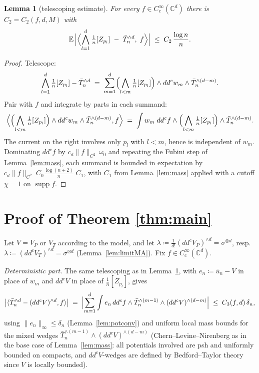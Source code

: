 \documentclass[12pt]{article}
\def\C{\mathbb{C}}
\def\E{\mathbb{E}}
\def\ddc{dd^c}
\DeclareMathOperator{\supp}{supp}
\newtheorem{lemma}{Lemma}[section]
\begin{document}
\begin{lemma}[telescoping estimate]\label{lem:telescope}
For every $f \in C^\infty_c(\C^d)$ there is $C_2 = C_2(f,d,M)$ with
\[
  \E\, \Bigl| \Bigl\langle \bigwedge_{l=1}^d \tfrac1n [Z_{p_l}]
  \;-\; \bar T_n^{\wedge d}, \; f \Bigr\rangle \Bigr|
  \;\le\; C_2\, \frac{\log n}{n} .
\]
\end{lemma}

\begin{proof}
Telescope:
\[
  \bigwedge_{l=1}^d \tfrac1n [Z_{p_l}] - \bar T_n^{\wedge d}
  \;=\; \sum_{m=1}^{d} \Bigl( \bigwedge_{l<m} \tfrac1n [Z_{p_l}] \Bigr)
        \wedge \ddc w_m \wedge \bar T_n^{\wedge (d-m)} .
\]
Pair with $f$ and integrate by parts in each summand:
\[
  \Bigl\langle \Bigl( \bigwedge_{l<m} \tfrac1n [Z_{p_l}]\Bigr) \wedge \ddc w_m \wedge
  \bar T_n^{\wedge(d-m)}, f \Bigr\rangle
  \;=\; \int w_m \; \ddc f \wedge \Bigl( \bigwedge_{l<m} \tfrac1n [Z_{p_l}] \Bigr)
  \wedge \bar T_n^{\wedge (d-m)} .
\]
The current on the right involves only $p_l$ with $l < m$, hence is independent of
$w_m$. Dominating $\ddc f$ by $c_d\|f\|_{C^2}\,\omega_0$ and repeating the
Fubini step of Lemma~\ref{lem:mass}, each summand is bounded in expectation by
$c_d \|f\|_{C^2}\; C_0 \frac{\log(n+2)}{n}\; C_1$, with $C_1$ from Lemma~\ref{lem:mass}
applied with a cutoff $\chi = 1$ on $\supp f$.
\end{proof}

\section{Proof of Theorem \ref{thm:main}}

Let $V = V_P$ or $V_T$ according to the model, and let
$\lambda \coloneqq \frac{1}{d!}(\ddc V_P)^{\wedge d} = \sigma^{\otimes d}$, resp.\
$\lambda \coloneqq (\ddc V_T)^{\wedge d} = \sigma^{\otimes d}$
(Lemma~\ref{lem:limitMA}). Fix $f \in C^\infty_c(\C^d)$.

\emph{Deterministic part.} The same telescoping as in Lemma~\ref{lem:telescope}, with
$e_n \coloneqq \bar u_n - V$ in place of $w_m$ and $\ddc V$ in place of
$\frac1n[Z_{p_l}]$, gives
\[
  \bigl| \langle \bar T_n^{\wedge d} - (\ddc V)^{\wedge d}, f \rangle \bigr|
  \;=\; \Bigl| \sum_{m=1}^d \int e_n\, \ddc f \wedge \bar T_n^{\wedge(m-1)} \wedge
  (\ddc V)^{\wedge (d-m)} \Bigr|
  \;\le\; C_3(f,d)\, \delta_n ,
\]
using $\|e_n\|_\infty \le \delta_n$ (Lemma~\ref{lem:potconv}) and uniform local mass
bounds for the mixed wedges $\bar T_n^{\wedge(m-1)} \wedge (\ddc V)^{\wedge(d-m)}$
(Chern--Levine--Nirenberg as in the base case of Lemma~\ref{lem:mass}: all potentials
involved are psh and uniformly bounded on compacts, and $\ddc V$-wedges are defined by
Bedford--Taylor theory since $V$ is locally bounded).
\end{document}

